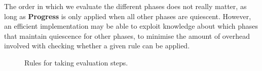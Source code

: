 The order in which we evaluate the different phases does not really matter, as
long as \textbf{Progress} is only applied when all other phases are quiescent.
However, an efficient implementation may be able to exploit knowledge about
which phases that maintain quiescence for other phases, to minimise the amount
of overhead involved with checking whether a given rule can be applied.

\begin{figure}[!ht]
\caption{Rules for taking evaluation steps.}\label{fig:rule:eval}
\end{figure}
